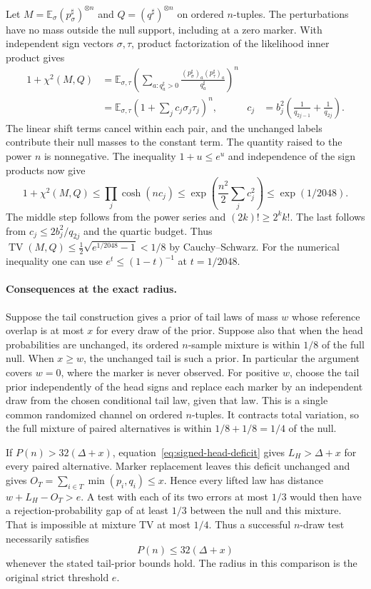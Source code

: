 Let \(M=\mathbb E_\sigma (p_\sigma^\sharp)^{\otimes n}\) and
\(Q=(q^\sharp)^{\otimes n}\) on ordered \(n\)-tuples. The
perturbations have no mass outside the null support, including at a
zero marker. With independent sign vectors \(\sigma,\tau\), product
factorization of the likelihood inner product gives
\begin{align*}
 1+\chi^2(M,Q)
 &=\mathbb E_{\sigma,\tau}
   \left(\sum_{a:q^\sharp_a>0}
      \frac{(p_\sigma^\sharp)_a(p_\tau^\sharp)_a}{q^\sharp_a}
   \right)^n  \\
 &=\mathbb E_{\sigma,\tau}
   \left(1+\sum_j c_j\sigma_j\tau_j\right)^n,
 & c_j&=b_j^2\left(\frac1{q_{2j-1}}+\frac1{q_{2j}}\right).
\end{align*}
The linear shift terms cancel within each pair, and the unchanged
labels contribute their null masses to the constant term. The
quantity raised to the power \(n\) is nonnegative. The inequality
\(1+u\le e^u\) and independence of the sign products now give
\[
 1+\chi^2(M,Q)
 \le \prod_j\cosh(nc_j)
 \le \exp\!\left(\frac{n^2}{2}\sum_j c_j^2\right)
 \le \exp(1/2048).
\]
The middle step follows from the power series and
\((2k)!\ge2^k k!\). The last follows from
\(c_j\le 2b_j^2/q_{2j}\) and the quartic budget. Thus
\(\operatorname{TV}(M,Q)\le\frac12\sqrt{e^{1/2048}-1}<1/8\)
by Cauchy--Schwarz. For the numerical inequality one can use
\(e^t\le(1-t)^{-1}\) at \(t=1/2048\).

\paragraph{Consequences at the exact radius.}
Suppose the tail construction gives a prior of tail laws of mass
\(w\) whose reference overlap is at most \(x\) for every draw of the
prior. Suppose also that when the head probabilities are unchanged,
its ordered \(n\)-sample mixture is within \(1/8\) of the full
null. When \(x\ge w\), the unchanged tail is such a prior. In
particular the argument covers \(w=0\), where the marker is never
observed. For positive \(w\), choose the tail prior independently
of the head signs and replace each marker by an independent draw
from the chosen conditional tail law, given that law. This is a
single common randomized channel on ordered \(n\)-tuples. It
contracts total variation, so the full mixture of paired alternatives
is within \(1/8+1/8=1/4\) of the null.

If \(P(n)>32(\Delta+x)\), equation~\eqref{eq:signed-head-deficit}
gives \(L_H>\Delta+x\) for every paired alternative. Marker
replacement leaves this deficit unchanged and gives
\(O_T=\sum_{i\in T}\min(p_i,q_i)\le x\). Hence every lifted law
has distance \(w+L_H-O_T>e\). A test with each of its two errors
at most \(1/3\) would then have a rejection-probability gap of at
least \(1/3\) between the null and this mixture. That is impossible
at mixture TV at most \(1/4\). Thus a successful \(n\)-draw test
necessarily satisfies
\begin{equation}
 P(n)\le32(\Delta+x)
 \label{eq:signed-head-necessity}
\end{equation}
whenever the stated tail-prior bounds hold. The radius in this
comparison is the original strict threshold \(e\).
